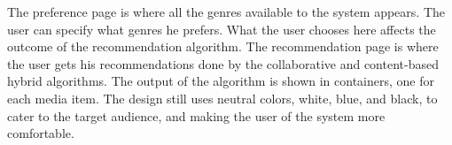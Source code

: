 The preference page is where all the genres available to the system appears. The user can specify what genres he prefers. What the user chooses here affects the outcome of the recommendation algorithm. The recommendation page is where the user gets his recommendations done by the collaborative and content-based hybrid algorithms. The output of the algorithm is shown in containers, one for each media item. The design still uses neutral colors, white, blue, and black, to cater to the target audience, and making the user of the system more comfortable.